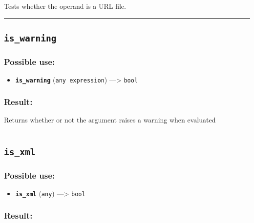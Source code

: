 \documentclass[]{book}
\providecommand{\tightlist}{%
  \setlength{\itemsep}{0pt}\setlength{\parskip}{0pt}}
\theoremstyle{definition}
\theoremstyle{definition}
\theoremstyle{definition}
\theoremstyle{remark}
\begin{document}
Tests whether the operand is a URL file.

\begin{center}\rule{0.5\linewidth}{\linethickness}\end{center}

\subsection{\texorpdfstring{\texttt{is\_warning}}{is\_warning}}\label{is_warning}

\subsubsection{Possible use:}\label{possible-use-308}

\begin{itemize}
\tightlist
\item
  \textbf{\texttt{is\_warning}} (\texttt{any\ expression})
  ---\textgreater{} \texttt{bool}
\end{itemize}

\subsubsection{Result:}\label{result-298}

Returns whether or not the argument raises a warning when evaluated

\begin{center}\rule{0.5\linewidth}{\linethickness}\end{center}

\subsection{\texorpdfstring{\texttt{is\_xml}}{is\_xml}}\label{is_xml}

\subsubsection{Possible use:}\label{possible-use-309}

\begin{itemize}
\tightlist
\item
  \textbf{\texttt{is\_xml}} (\texttt{any}) ---\textgreater{}
  \texttt{bool}
\end{itemize}

\subsubsection{Result:}\label{result-299}
\end{document}
